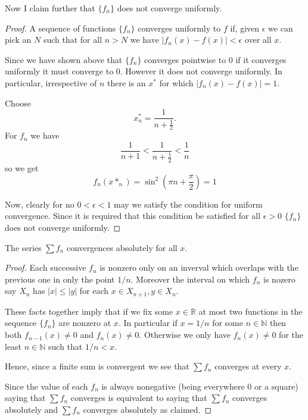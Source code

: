 \documentclass[12pt]{article}
\begin{document}
Now I claim further that $\{f_n\}$ does not converge uniformly.
\begin{proof}
A sequence of functions $\{f_n\}$ converges uniformly to $f$ if, given $\epsilon$ we can pick an $N$ such that for all $n > N$ we have $\left| f_n(x) - f(x) \right| < \epsilon$ over all $x$.

Since we have shown above that $\{f_n\}$ converges pointwise to 0 if it converges uniformly it must converge to 0. However it does not converge uniformly. In particular, irrespective of $n$ there is an $x^*$ for which $\left| f_n(x) - f(x) \right| = 1$. 

Choose 
\[x^*_n = \frac{1}{n+\frac{1}{2}}.\]
For $f_n$ we have 
\[  \frac{1}{n+1}< \frac{1}{n+\frac{1}{2}} < \frac{1}{n} \]
so we get
\[f_n(x*_n)=\sin^2\left( \pi n + \frac{\pi}{2}\right)=1\]


Now, clearly for no $0<\epsilon < 1$ may we satisfy the condition for uniform convergence. Since it is required that this condition be satisfied for all $\epsilon >0$ $\{f_n\}$ does not converge uniformly.
\end{proof}

The series $\sum f_n$ convergences absolutely for all $x$.

\begin{proof}
Each successive $f_n$ is nonzero only on an inverval which overlaps with the previous one in only the point $1/n$. Moreover the interval on which $f_{n}$ is nozero say $X_{n}$ has $|x| \leq |y|$ for each $x \in X_{n+1}, y \in X_n$.

These facts together imply that if we fix some $x \in \mathbb{R}$ at most two functions in the sequence $\{f_n\}$ are nonzero at $x$. In particular if $x = 1/n$ for some $n \in \mathbb{N}$ then both $f_{n-1}(x) \neq 0$ and $f_n(x)\neq 0$. Otherwise we only have $f_n(x) \neq0  $ for the least $n \in \mathbb{N}$ such that $1/n <x$.  

Hence, since a finite sum is convergent we see that $\sum f_n$ converges at every $x$.

Since the value of each $f_n$ is always nonegative (being everywhere 0 or a square) saying that $\sum f_n$ converges is equivalent to saying that $\sum f_n$ converges absolutely and $\sum f_n$ converges absolutely as claimed.
\end{proof}
\end{document}
